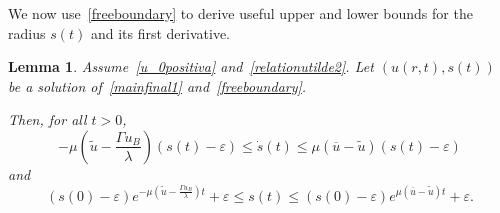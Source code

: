 \documentclass[12pt,a4paper,intlimits,sumlimits]{amsart}
\theoremstyle{definition}
\theoremstyle{plain}
\newtheorem{lemma}[definition]{Lemma}
\numberwithin{equation}{section}
\renewcommand{\leq}{\leqslant}
\begin{document}
We now use~\eqref{freeboundary} to derive useful upper and lower bounds for the radius $s(t)$ and its first derivative.

\begin{lemma}\label{lemmastimespunto}
Assume~\eqref{u_0positiva} and~\eqref{relationutilde2}.
Let $(u(r,t), s(t))$ be a solution of~\eqref{mainfinal1} and~\eqref{freeboundary}.

Then, for all $t>0$,
\begin{equation}\label{stimespunto}
-\mu\left(\widetilde u-\frac{\Gamma u_B}{\lambda}\right)(s(t)-\varepsilon)\leq \dot s(t)\leq \mu(\overline{u}-\widetilde u)(s(t)-\varepsilon)
\end{equation}
and
\begin{equation}\label{stimespunto2}
(s(0)-\varepsilon)e^{-\mu\left(\widetilde u-\frac{\Gamma u_B}{\lambda}\right)t} +\varepsilon\leq s(t)\leq (s(0)-\varepsilon)e^{\mu(\overline{u}-\widetilde u) t}+\varepsilon .
\end{equation}
\end{lemma}
\end{document}
